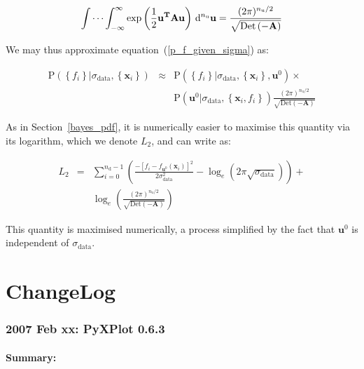 \documentclass[a4paper,onecolumn,11pt]{book}
\begin{document}
\begin{equation}
\idotsint_{-\infty}^{\infty}
\exp \left(
\frac{1}{2}\mathbf{u}^\mathbf{T} \mathbf{A} \mathbf{u}
\right) \,\mathrm{d}^{n_\mathrm{u}}\mathbf{u}
=
\frac{
(2\pi)^{n_\mathrm{u}/2}
}{
\sqrt{\mathrm{Det}\left(-\mathbf{A}\right)}
}
\end{equation}

\noindent We may thus approximate equation~(\ref{p_f_given_sigma}) as:

\begin{eqnarray}
\mathrm{P}\left( \left\{ f_i \right\} | \sigma_\mathrm{data}, \left\{ \mathbf{x}_i \right\} \right)
& \approx &
\mathrm{P}\left( \left\{ f_i \right\} | \sigma_\mathrm{data}, \left\{ \mathbf{x}_i \right\}, \mathbf{u}^0 \right)
\times \\
& &
\mathrm{P}\left( \mathbf{u}^0 | \sigma_\mathrm{data}, \left\{ \mathbf{x}_i, f_i \right\} \right)
\frac{
(2\pi)^{n_\mathrm{u}/2}
}{
\sqrt{\mathrm{Det}\left(-\mathbf{A}\right)}
}
\nonumber
\end{eqnarray}

As in Section~\ref{bayes_pdf}, it is numerically easier to maximise this
quantity via its logarithm, which we denote $L_2$, and can write as:

\begin{eqnarray}
L_2 & = &
\sum_{i=0}^{n_\mathrm{d}-1}
\left(
\frac{
-\left[f_i - f_{\mathbf{u}^0}(\mathbf{x}_i)\right]^2
}{
2\sigma_\mathrm{data}^2
}
- \log_e \left(2\pi\sqrt{\sigma_\mathrm{data}} \right)
\right) +
\\ & & \nonumber
\log_e \left(
\frac{
(2\pi)^{n_\mathrm{u}/2}
}{
\sqrt{\mathrm{Det}\left(-\mathbf{A}\right)}
}
\right)
\end{eqnarray}

This quantity is maximised numerically, a process simplified by the fact that
$\mathbf{u}^0$ is independent of $\sigma_\mathrm{data}$.

\chapter{ChangeLog}

\subsection*{2007 Feb xx: PyXPlot 0.6.3}

\subsubsection*{Summary:}
\end{document}
